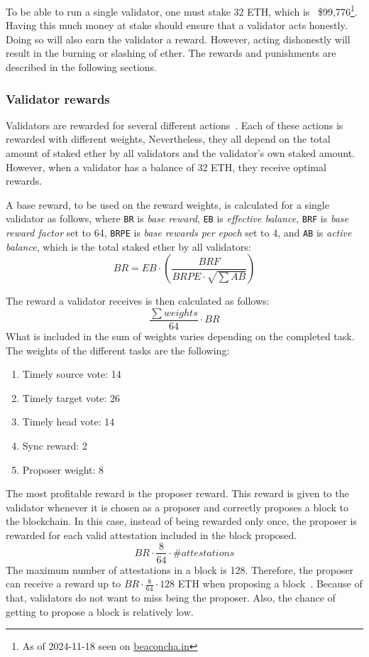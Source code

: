 To be able to run a single validator, one must stake 32 ETH,
which is ~\$99,776\footnote{As of 2024-11-18 seen on \href{https://beaconcha.in/}{beaconcha.in}}.
Having this much money at stake should ensure that a validator acts honestly.
Doing so will also earn the validator a reward.
However, acting dishonestly will result in the burning or slashing of ether.
The rewards and punishments are described in the following sections.
\subsubsection{Validator rewards}\label{subsubsec:valrewards}
Validators are rewarded for several different actions~\cite{PoSRewAndPen}.
Each of these actions is rewarded with different weights,
Nevertheless, they all depend on the total amount of staked ether by all validators and the validator's own staked amount.
However, when a validator has a balance of 32 ETH\@, they receive optimal rewards.

A base reward, to be used on the reward weights, is calculated for a single validator as follows, where \texttt{BR} is \textit{base reward}, \texttt{EB} is \textit{effective balance}, \texttt{BRF} is \textit{base reward factor} set to 64,
\texttt{BRPE} is \textit{base rewards per epoch} set to 4,
and \texttt{AB} is \textit{active balance}, which is the total staked ether by all validators:
\begin{equation}
    BR = EB\cdot(\frac{BRF}{BRPE\cdot \sqrt{\sum{AB}}})
    \label{eq:basereward}
\end{equation}


The reward a validator receives is then calculated as follows:
\begin{equation}
    \frac{\sum{weights}}{64}\cdot BR
    \label{eq:valrewards}
\end{equation}
What is included in the sum of weights varies depending on the completed task.
The weights of the different tasks are the following:
\begin{enumerate}
    \item Timely source vote: 14
    \item Timely target vote: 26
    \item Timely head vote: 14
    \item Sync reward: 2
    \item Proposer weight: 8
\end{enumerate}
The most profitable reward is the proposer reward.
This reward is given to the validator whenever it is chosen as a proposer and correctly proposes a block to the blockchain.
In this case, instead of being rewarded only once, the proposer is rewarded for each valid attestation included in the block proposed.
\begin{equation}
    BR\cdot\frac{8}{64}\cdot \#attestations\label
    {eq:propreward}
\end{equation}
The maximum number of attestations in a block is 128.
Therefore, the proposer can receive a reward up to $BR\cdot\frac{8}{64}\cdot128$ ETH when proposing a block~\cite{PoSRewAndPen,consensus-spec-phase-0}.
Because of that, validators do not want to miss being the proposer.
Also, the chance of getting to propose a block is relatively low.

